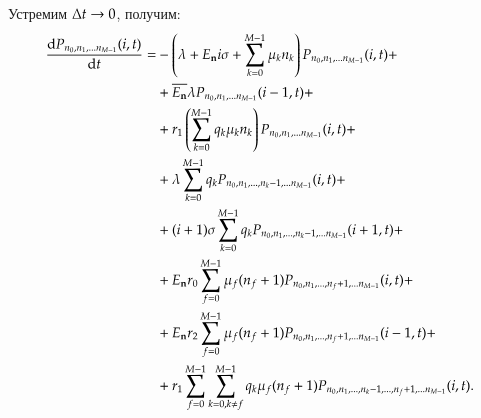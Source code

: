 Устремим \(\dt \rightarrow 0\), получим:
\begin{equation*}\begin{aligned}
\dv{\seqStandart{P}{n}(i,t)}{t}= 
    &-\Q{\les+\allExecutionFullIntensity{n}{k}}\seqStandart{P}{n}(i,t)+\\
    &+\overline{\En} \lambda \seqStandart{P}{n}(i-1,t)+\\
    &+r_1 \Q{\allExecutionRelativeIntensity{n}{k}} \seqStandart{P}{n}(i,t) + \\
    &+\lambda\sum_{k=0}^{M-1}q_k \seqMinus{P}{n}{k}(i,t) + \\
    &+(i+1)\sigma\sum_{k=0}^{M-1}q_k \seqMinus{P}{n}{k}(i+1,t) + \\
    &+\En r_0 \sum_{f=0}^{M-1} \mu_f (n_f + 1) \seqPlus{P}{n}{f}(i,t) + \\
    &+\En r_2 \sum_{f=0}^{M-1} \mu_f (n_f + 1) \seqPlus{P}{n}{f}(i-1,t) + \\
    &+r_1 \feedbackSum{f}{k}
        q_k \mu_f (n_f+1) \seqMinusPlus{P}{n}{k}{f}(i,t).
\end{aligned}\end{equation*}

